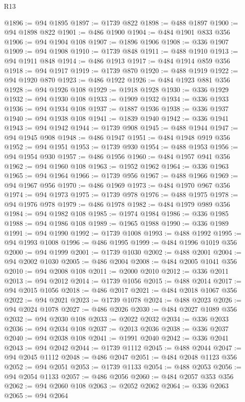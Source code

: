 \begin{lexlean}{R13}
\begin{coremodule}
@1896 := @94 @1895
@1897 := @1739 @822
@1898 := @488 @1897
@1900 := @94 @1898 @822
@1901 := @486 @1900
@1904 := @484 @1901 @833 @356
@1906 := @94 @1904 @108
@1907 := @1896 @1906
@1908 := @336 @1907
@1909 := @94 @1908
@1910 := @1739 @848
@1911 := @488 @1910
@1913 := @94 @1911 @848
@1914 := @486 @1913
@1917 := @484 @1914 @859 @356
@1918 := @94 @1917
@1919 := @1739 @870
@1920 := @488 @1919
@1922 := @94 @1920 @870
@1923 := @486 @1922
@1926 := @484 @1923 @881 @356
@1928 := @94 @1926 @108
@1929 := @1918 @1928
@1930 := @336 @1929
@1932 := @94 @1930 @108
@1933 := @1909 @1932
@1934 := @336 @1933
@1936 := @94 @1934 @108
@1937 := @1887 @1936
@1938 := @336 @1937
@1940 := @94 @1938 @108
@1941 := @1839 @1940
@1942 := @336 @1941
@1943 := @94 @1942
@1944 := @1739 @908
@1945 := @488 @1944
@1947 := @94 @1945 @908
@1948 := @486 @1947
@1951 := @484 @1948 @919 @356
@1952 := @94 @1951
@1953 := @1739 @930
@1954 := @488 @1953
@1956 := @94 @1954 @930
@1957 := @486 @1956
@1960 := @484 @1957 @941 @356
@1962 := @94 @1960 @108
@1963 := @1952 @1962
@1964 := @336 @1963
@1965 := @94 @1964
@1966 := @1739 @956
@1967 := @488 @1966
@1969 := @94 @1967 @956
@1970 := @486 @1969
@1973 := @484 @1970 @967 @356
@1974 := @94 @1973
@1975 := @1739 @978
@1976 := @488 @1975
@1978 := @94 @1976 @978
@1979 := @486 @1978
@1982 := @484 @1979 @989 @356
@1984 := @94 @1982 @108
@1985 := @1974 @1984
@1986 := @336 @1985
@1988 := @94 @1986 @108
@1989 := @1965 @1988
@1990 := @336 @1989
@1991 := @94 @1990
@1992 := @1739 @1008
@1993 := @488 @1992
@1995 := @94 @1993 @1008
@1996 := @486 @1995
@1999 := @484 @1996 @1019 @356
@2000 := @94 @1999
@2001 := @1739 @1030
@2002 := @488 @2001
@2004 := @94 @2002 @1030
@2005 := @486 @2004
@2008 := @484 @2005 @1041 @356
@2010 := @94 @2008 @108
@2011 := @2000 @2010
@2012 := @336 @2011
@2013 := @94 @2012
@2014 := @1739 @1056
@2015 := @488 @2014
@2017 := @94 @2015 @1056
@2018 := @486 @2017
@2021 := @484 @2018 @1067 @356
@2022 := @94 @2021
@2023 := @1739 @1078
@2024 := @488 @2023
@2026 := @94 @2024 @1078
@2027 := @486 @2026
@2030 := @484 @2027 @1089 @356
@2032 := @94 @2030 @108
@2033 := @2022 @2032
@2034 := @336 @2033
@2036 := @94 @2034 @108
@2037 := @2013 @2036
@2038 := @336 @2037
@2040 := @94 @2038 @108
@2041 := @1991 @2040
@2042 := @336 @2041
@2043 := @94 @2042
@2044 := @1739 @1112
@2045 := @488 @2044
@2047 := @94 @2045 @1112
@2048 := @486 @2047
@2051 := @484 @2048 @1123 @356
@2052 := @94 @2051
@2053 := @1739 @1133
@2054 := @488 @2053
@2056 := @94 @2054 @1133
@2057 := @486 @2056
@2060 := @484 @2057 @353 @356
@2062 := @94 @2060 @108
@2063 := @2052 @2062
@2064 := @336 @2063
@2065 := @94 @2064

\end{coremodule}
\end{lexlean}
